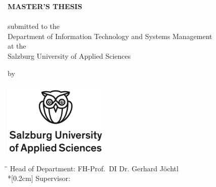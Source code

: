 \begin{titlepage}

\hspace{7cm}

\begin{center}
	{\Large\uppercase\expandafter{\bf MASTER'S THESIS}}\\[0.5ex]
	\vspace{1cm}
	\Large{\bf\large \Title}\\
	\vspace{1.5cm}
	\normalsize submitted to the\\
	Department of Information Technology and Systems Management\\
	at the\\
	Salzburg University of Applied Sciences\\
\end{center}

\vspace{2cm}

\begin{center}
	\normalsize by
	\\
	{
		\Large{\bf\large \Author}\\
	}
	\vspace{1cm}
	\includegraphics[width=5cm]{BilderAllgemein/FH_Salzburg_Logo_ENG_GT.jpg}\medskip
\end{center}
	
\vspace{1cm}

\begin{tabbing}
	\hspace*{2cm}\=\hspace*{4cm}\= \kill
	\> Head of Department: \> FH-Prof.~DI Dr. Gerhard Jöchtl \\*[0.2cm]
	\> Supervisor: \> \Advisor
\end{tabbing}

\vfill	

\begin{center}
\VenueMonthYear\\
\end{center}
\end{titlepage}